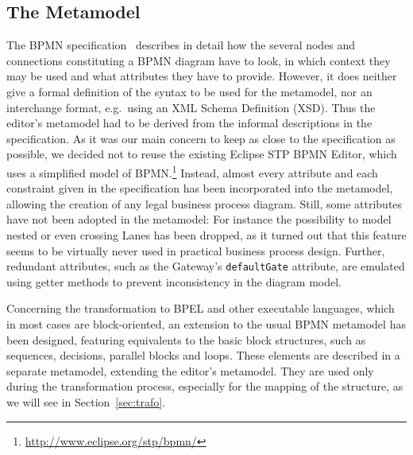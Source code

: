 \subsection{The Metamodel}
\label{sec:editor_meta}

The BPMN specification~\cite{omg2006business} describes in detail how the several nodes and connections constituting a BPMN diagram have to look, in which context they may be used and what attributes they have to provide.  However, it does neither give a formal definition of the syntax to be used for the metamodel, nor an interchange format, e.g.\ using an XML Schema Definition (XSD).  Thus the editor's metamodel had to be derived from the informal descriptions in the specification.
As it was our main concern to keep as close to the specification as possible, we decided not to reuse the existing Eclipse STP BPMN Editor, which uses a simplified model of BPMN.\footnote{\url{http://www.eclipse.org/stp/bpmn/}}  Instead, almost every attribute and each constraint given in the specification has been incorporated into the metamodel, allowing the creation of any legal business process diagram.
Still, some attributes have not been adopted in the metamodel:  For instance the possibility to model nested or even crossing Lanes has been dropped, as it turned out that this feature seems to be virtually never used in practical business process design.  Further, redundant attributes, such as the Gateway's \texttt{defaultGate} attribute, are emulated using getter methods to prevent inconsistency in the diagram model.

Concerning the transformation to BPEL and other executable languages, which in most cases are block-oriented, an extension to the usual BPMN metamodel has been designed, featuring equivalents to the basic block structures, such as sequences, decisions, parallel blocks and loops.  These elements are described in a separate metamodel, extending the editor's metamodel.  They are used only during the transformation process, especially for the mapping of the structure, as we will see in Section~\ref{sec:trafo}.
